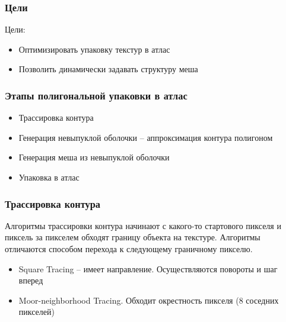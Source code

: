 \documentclass[10pt, unicode]{beamer}
\begin{document}
    \begin{frame}
        \frametitle{Цели}
        Цели:
        \begin{itemize}
            \item Оптимизировать упаковку текстур в атлас
            \item Позволить динамически задавать структуру меша
        \end{itemize}
    \end{frame}
    \begin{frame}
        \frametitle{Этапы полигональной упаковки в атлас}
        \begin{itemize}
            \item Трассировка контура
            \item Генерация невыпуклой оболочки -- аппроксимация контура полигоном
            \item Генерация меша из невыпуклой оболочки
            \item Упаковка в атлас
        \end{itemize}
    \end{frame}
    \begin{frame}
        \frametitle{Трассировка контура}
        Алгоритмы трассировки контура начинают с какого-то стартового пикселя и пиксель за пикселем обходят границу 
        объекта на текстуре. Алгоритмы отличаются способом перехода к следующему граничному пикселю. 
        \begin{itemize}
            \item Square Tracing -- имеет направление. Осуществляются повороты и шаг вперед
            \item Moor-neighborhood Tracing. Обходит окрестность пикселя (8 соседних пикселей)
        \end{itemize}
    \end{frame}
\end{document}
